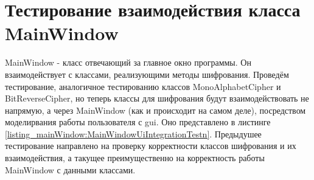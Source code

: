\documentclass[a4paper,12pt]{article}
\begin{document}
\newpage\section{Тестирование взаимодействия класса MainWindow}
MainWindow - класс отвечающий за главное окно программы. Он взаимодействует с классами, реализующими методы шифрования. Проведём тестирование, аналогичное тестированию классов MonoAlphabetCipher и BitReverseCipher, но теперь классы для шифрования будут взаимодействовать не напрямую, а через MainWindow (как и происходит на самом деле), посредством моделирвания работы пользователя с gui. Оно представлено в листинге \ref{listing_mainWindow:MainWindowUiIntegrationTestn}. Предыдушее тестирование направлено на проверку корректности классов шифрования и их взаимодействия, а такущее преимущественно на корректность работы MainWindow с данными классами.
\end{document}
